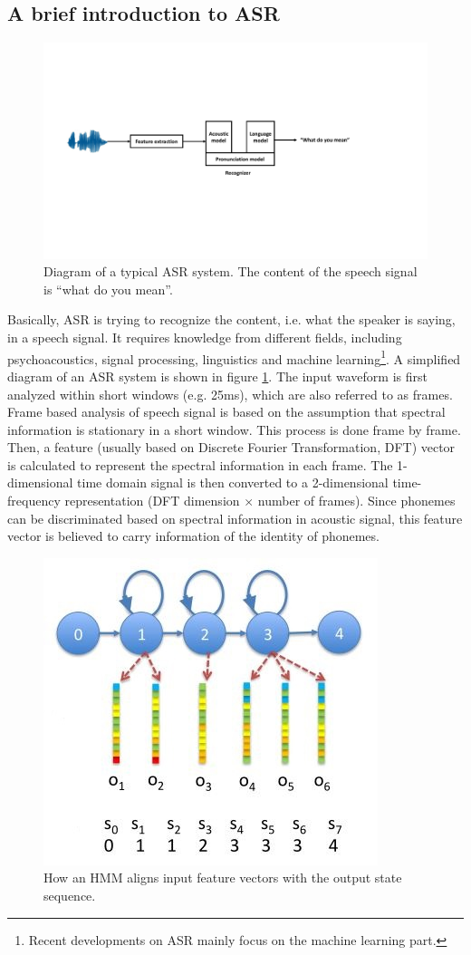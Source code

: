 \subsection{A brief introduction to ASR}

\begin{figure}[t]
\centering
\captionsetup{justification=centering}
\includegraphics[width = 1.0\linewidth]{figures/ASR_diagram.pdf}
\caption{Diagram of a typical ASR system. The content of the speech signal is ``what do you mean''.}
\label{fig:asr_diagram}
\end{figure}

 Basically, ASR is trying to recognize the content, i.e. what the speaker is saying, in a speech signal. It requires knowledge from different fields, including psychoacoustics, signal processing, linguistics and machine learning\footnote{Recent developments on ASR mainly focus on the machine learning part.}. A simplified diagram of an ASR system is shown in figure \ref{fig:asr_diagram}. The input waveform is first analyzed within short windows (e.g. 25ms), which are also referred to as frames. Frame based analysis of speech signal is based on the assumption that spectral information is stationary in a short window. This process is done frame by frame. Then, a feature (usually based on Discrete Fourier Transformation, DFT) vector is calculated to represent the spectral information in each frame. The 1-dimensional time domain signal is then converted to a 2-dimensional time-frequency representation (DFT dimension $\times$ number of frames). Since phonemes can be discriminated based on spectral information in acoustic signal, this feature vector is believed to carry information of the identity of phonemes.

 \begin{figure}[t]
\centering
\captionsetup{justification=centering}
\includegraphics[width = 0.4\linewidth]{figures/HMM_state.JPG}
\caption{How an HMM aligns input feature vectors with the output state sequence.}
\label{fig:hmm_diagram}
\end{figure}

